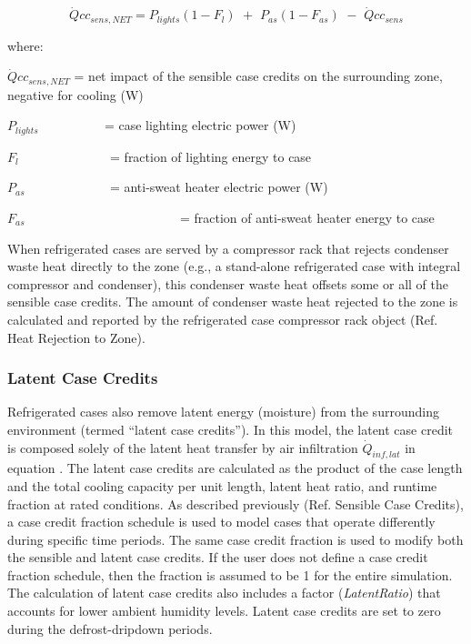 \begin{equation}
\dot Qc{c_{sens,NET}} = {P_{lights}}(1 - {F_l})\,\, + \,\,{P_{as}}(1 - {F_{as}})\,\, - \,\,\dot Qc{c_{sens}}
\end{equation}

where:

\(\dot Qc{c_{sens,NET}}\) = net impact of the sensible case credits on the surrounding zone, negative for cooling (W)

\({P_{lights}}\) ~~~~~~~~~ = case lighting electric power (W)

\({F_l}\) ~~~~~~~~~~~~~ = fraction of lighting energy to case

\({P_{as}}\) ~~~~~~~~~~~~ = anti-sweat heater electric power (W)

\({F_{as}}\) ~~~~~~~~~~~~~~~~~~~~~~~ = fraction of anti-sweat heater energy to case

When refrigerated cases are served by a compressor rack that rejects condenser waste heat directly to the zone (e.g., a stand-alone refrigerated case with integral compressor and condenser), this condenser waste heat offsets some or all of the sensible case credits. The amount of condenser waste heat rejected to the zone is calculated and reported by the refrigerated case compressor rack object (Ref. Heat Rejection to Zone).

\subsubsection{Latent Case Credits}\label{latent-case-credits}

Refrigerated cases also remove latent energy (moisture) from the surrounding environment (termed ``latent case credits''). In this model, the latent case credit is composed solely of the latent heat transfer by air infiltration \({\dot Q_{inf,lat}}\) in equation . The latent case credits are calculated as the product of the case length and the total cooling capacity per unit length, latent heat ratio, and runtime fraction at rated conditions. As described previously (Ref. Sensible Case Credits), a case credit fraction schedule is used to model cases that operate differently during specific time periods. The same case credit fraction is used to modify both the sensible and latent case credits. If the user does not define a case credit fraction schedule, then the fraction is assumed to be 1 for the entire simulation. The calculation of latent case credits also includes a factor (\emph{LatentRatio}) that accounts for lower ambient humidity levels. Latent case credits are set to zero during the defrost-dripdown periods.

